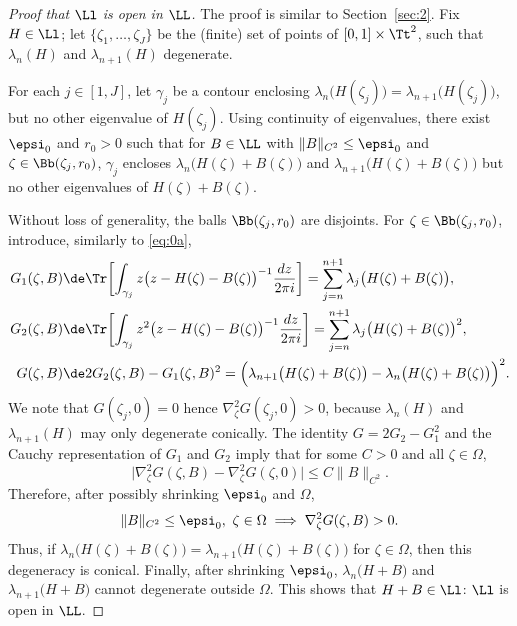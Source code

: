 \begin{proof}[Proof that $\Ll$ is open in $\LL$] The proof is similar to Section~\ref{sec:2}. Fix $H \in \Ll$; let $\{ \zeta_1, \dots, \zeta_J\}$ be the (finite) set of points of $[0,1] \times \Tt^2$, such that $\lambda_n(H)$ and $\lambda_{n+1}(H)$ degenerate.

For each $j \in [1,J]$, let $\gamma_j$ be a contour enclosing $\lambda_n\bigl(H(\zeta_j)\bigr) = \lambda_{n+1}\bigl(H(\zeta_j)\bigr)$, but no other eigenvalue of $H(\zeta_j)$. Using continuity of eigenvalues, there exist $\epsi_0$ and $r_0 > 0$ such that for $B \in \LL$ with $\| B \|_{C^2} \leq \epsi_0$ and $\zeta \in \Bb(\zeta_j,r_0)$, $\gamma_j$ encloses
$\lambda_n\bigl(H(\zeta) + B(\zeta)\bigr)$ and $\lambda_{n+1}\bigl(H(\zeta) + B(\zeta)\bigr)$ but no other eigenvalues of $H(\zeta) + B(\zeta)$.

Without loss of generality, the balls $\Bb(\zeta_j,r_0)$ are disjoints. For $\zeta \in \Bb(\zeta_j,r_0)$, introduce, similarly to \eqref{eq:0a},
\[
\begin{split}
G_1(\zeta,B) &\de \Tr \biggl[ \int_{\gamma_j} z \bigl(z-H(\zeta)-B(\zeta)\bigr)^{-1} \dfrac{dz}{2\pi i} \biggr] = \sum_{j = n}^{n+1}\lambda_j\bigl(H(\zeta)+B(\zeta)\bigr),
\\
G_2(\zeta,B) &\de \Tr \biggl[ \int_{\gamma_j} z^2 \bigl(z-H(\zeta)-B(\zeta)\bigr)^{-1} \dfrac{dz}{2\pi i} \biggr] = \sum_{j = n}^{n+1} \lambda_j\bigl(H(\zeta)+B(\zeta)\bigr)^2,
\\
G(\zeta,B) &\de 2G_2(\zeta,B) - G_1(\zeta,B)^2 = \Bigl(\lambda_{n+1}\bigl(H(\zeta)+B(\zeta)\bigr) - \lambda_n\bigl(H(\zeta)+B(\zeta)\bigr)\Bigr)^2.
\end{split}
\]
We note that $G(\zeta_j,0) = 0$ hence $\nabla^2_\zeta G(\zeta_j,0) > 0$, because $\lambda_n(H)$ and $\lambda_{n+1}(H)$ may only degenerate conically. The identity $G = 2G_2-G_1^2$ and the Cauchy representation of $G_1$ and $G_2$ imply that for some $C > 0$ and all $\zeta \in \Omega$,
\begin{equation*}
\big| \nabla^2_\zeta G(\zeta,B) - \nabla^2_\zeta G(\zeta,0) \big| \leq C \| B \|_{C^2}.
\end{equation*}
Therefore, after possibly shrinking $\epsi_0$ and $\Omega$,
\begin{equation*}
\| B \|_{C^2} \leq \epsi_0, \ \zeta \in \Omega \implies \nabla^2_\zeta G(\zeta,B) > 0.
\end{equation*}
Thus, if $\lambda_n\bigl(H(\zeta) + B(\zeta)\bigr) = \lambda_{n+1}\bigl(H(\zeta) + B(\zeta)\bigr)$ for $\zeta\in \Omega$, then this degeneracy is conical. Finally, after shrinking $\epsi_0$, $\lambda_n\bigl(H + B\bigr)$ and $\lambda_{n+1}\bigl(H + B\bigr)$ cannot degenerate outside $\Omega$. This shows that $H+B \in \Ll$: $\Ll$ is open in $\LL$.
\end{proof}

